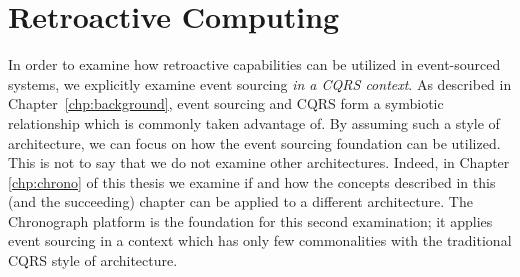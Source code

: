 \section{Retroactive Computing}
In order to examine how retroactive capabilities can be utilized in event-sourced 
systems, we explicitly examine event sourcing \emph{in a CQRS context}. As described 
in Chapter~\ref{chp:background}, event sourcing and CQRS form a symbiotic relationship 
which is commonly taken advantage of. By assuming such a style of architecture, we 
can focus on how the event sourcing foundation can be utilized. This is not to say 
that we do not examine other architectures. 
Indeed, in Chapter \ref{chp:chrono} of this thesis we examine if and how the concepts 
described in this (and the succeeding) chapter can be applied to a different 
architecture.  The Chronograph platform is the foundation for this second examination; 
it applies event sourcing in a context which has only few commonalities with the 
traditional CQRS style of architecture.
